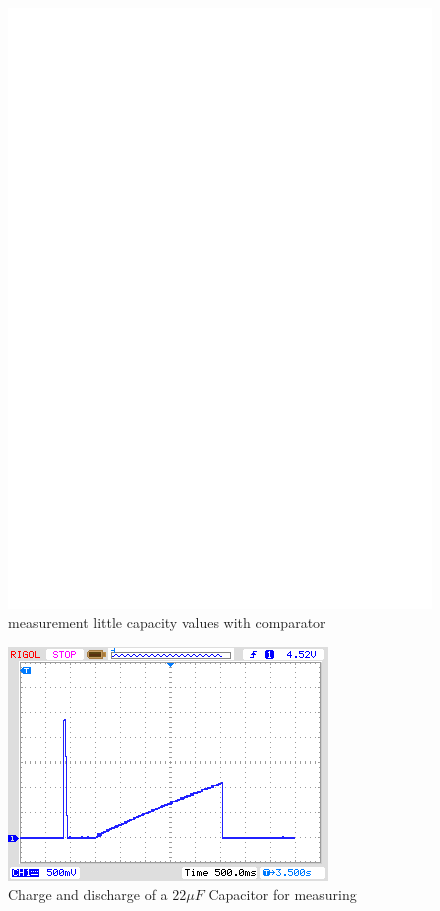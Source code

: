 \begin{figure}[H]
\centering
\includegraphics[]{../FIG/Comparat.eps}
\caption{measurement little capacity values with comparator}
\label{fig:comparat}
\end{figure}

\begin{figure}[H]
  \centering
    \includegraphics[]{../PNG/charge_22uF.png}
  \caption{Charge and discharge of a \(22\mu F\) Capacitor for measuring}
  \label{pic:c22uF}
\end{figure}


